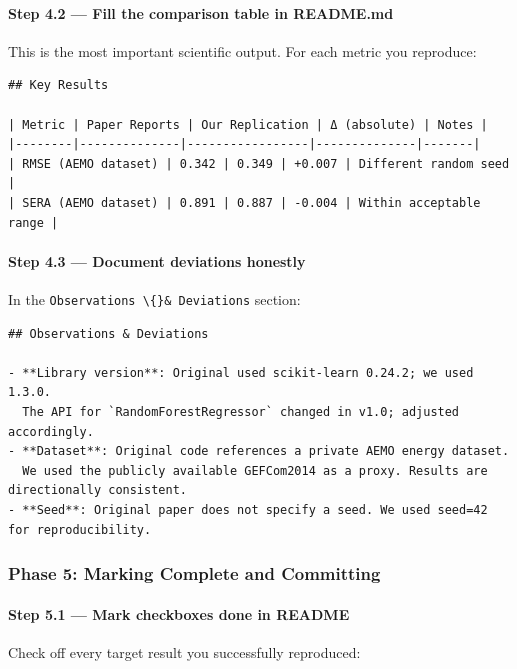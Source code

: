\paragraph{Step 4.2 --- Fill the comparison table in
README.md}\label{step-4.2-fill-the-comparison-table-in-readme.md}

This is the most important scientific output. For each metric you
reproduce:

\begin{verbatim}
## Key Results

| Metric | Paper Reports | Our Replication | Δ (absolute) | Notes |
|--------|--------------|-----------------|--------------|-------|
| RMSE (AEMO dataset) | 0.342 | 0.349 | +0.007 | Different random seed |
| SERA (AEMO dataset) | 0.891 | 0.887 | -0.004 | Within acceptable range |
\end{verbatim}

\paragraph{Step 4.3 --- Document deviations
honestly}\label{step-4.3-document-deviations-honestly}

In the \texttt{Observations \textbackslash\{\}\& Deviations} section:

\begin{verbatim}
## Observations & Deviations

- **Library version**: Original used scikit-learn 0.24.2; we used 1.3.0. 
  The API for `RandomForestRegressor` changed in v1.0; adjusted accordingly.
- **Dataset**: Original code references a private AEMO energy dataset. 
  We used the publicly available GEFCom2014 as a proxy. Results are directionally consistent.
- **Seed**: Original paper does not specify a seed. We used seed=42 for reproducibility.
\end{verbatim}

\subsubsection{Phase 5: Marking Complete and
Committing}\label{phase-5-marking-complete-and-committing}

\paragraph{Step 5.1 --- Mark checkboxes done in
README}\label{step-5.1-mark-checkboxes-done-in-readme}

Check off every target result you successfully reproduced:

